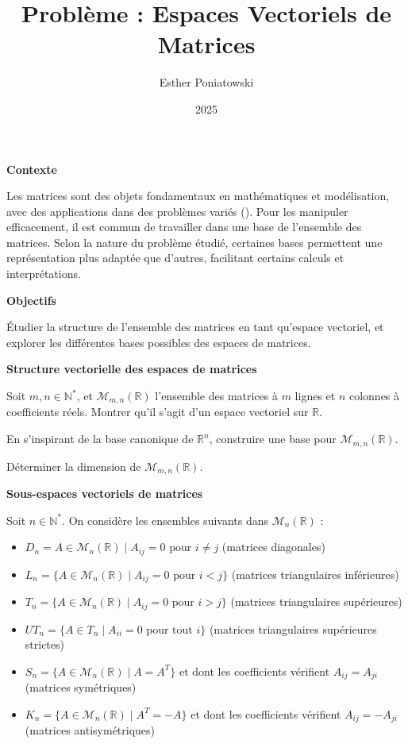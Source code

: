 \documentclass[10pt,a4paper]{article}
\title{Problème : Espaces Vectoriels de Matrices}
\author{Esther Poniatowski}
\date{2025}
\begin{document}
\textbf{Contexte}

Les matrices sont des objets fondamentaux en mathématiques et modélisation, avec des applications
dans des problèmes variés (). Pour les manipuler efficacement, il est commun de travailler dans une
base de l'ensemble des matrices. Selon la nature du problème étudié, certaines bases permettent une
représentation plus adaptée que d'autres, facilitant certains calculs et interprétations.

\bigskip
\textbf{Objectifs}

Étudier la structure de l'ensemble des matrices en tant qu'espace vectoriel, et explorer les
différentes bases possibles des espaces de matrices.

\bigskip
\textbf{Structure vectorielle des espaces de matrices}

\q Soit $m, n \in \mathbb{N}^*$, et $\mathcal{M}_{m,n}(\mathbb{R})$ l'ensemble des matrices à $m$ lignes et
$n$ colonnes à coefficients réels. Montrer qu'il s'agit d'un espace vectoriel sur $\mathbb{R}$.

\q En s'inspirant de la base canonique de $\mathbb{R}^n$, construire une base pour
$\mathcal{M}_{m,n}(\mathbb{R})$.

\q Déterminer la dimension de $\mathcal{M}_{m,n}(\mathbb{R})$.

\bigskip
\textbf{Sous-espaces vectoriels de matrices}

Soit $n \in \mathbb{N}^*$. On considère les ensembles suivants dans $\mathcal{M}_n(\mathbb{R})$ :
\begin{itemize}
    \item $D_n = {A \in \mathcal{M}_n(\mathbb{R}) \mid A_{ij} = 0 \text{ pour } i \neq j}$ (matrices
    diagonales)
    \item $L_n = \{A \in \mathcal{M}_n(\mathbb{R}) \mid A_{ij} = 0 \text{ pour } i < j\}$ (matrices
    triangulaires inférieures)
    \item $T_n = \{A \in \mathcal{M}_n(\mathbb{R}) \mid A_{ij} = 0 \text{ pour } i > j\}$ (matrices
    triangulaires supérieures)
    \item $UT_n = \{A \in T_n \mid A_{ii} = 0 \text{ pour tout } i\}$ (matrices triangulaires
    supérieures strictes)
    \item $S_n = \{A \in \mathcal{M}_n(\mathbb{R}) \mid A = A^T\}$ et dont les coefficients
    vérifient $A_{ij} = A_{ji}$ (matrices symétriques)
    \item $K_n = \{A \in \mathcal{M}_n(\mathbb{R}) \mid A^T = -A\}$ et dont les coefficients
    vérifient $A_{ij} = -A_{ji}$ (matrices antisymétriques)
\end{itemize}
\end{document}
